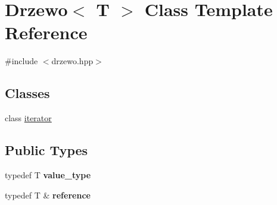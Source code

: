 \hypertarget{class_drzewo}{}\section{Drzewo$<$ T $>$ Class Template Reference}
\label{class_drzewo}


{\ttfamily \#include $<$drzewo.\+hpp$>$}

\subsection*{Classes}
\begin{DoxyCompactItemize}
\item 
class \hyperlink{class_drzewo_1_1iterator}{iterator}
\end{DoxyCompactItemize}
\subsection*{Public Types}
\begin{DoxyCompactItemize}
\item 
\mbox{\label{class_drzewo_a349719391d8470c24d68e8a4f0fecf3c}} 
typedef T {\bfseries value\+\_\+type}
\item 
\mbox{\label{class_drzewo_ad9689c01b3f07d1601e199799fcc1705}} 
typedef T \& {\bfseries reference}
\end{DoxyCompactItemize}
